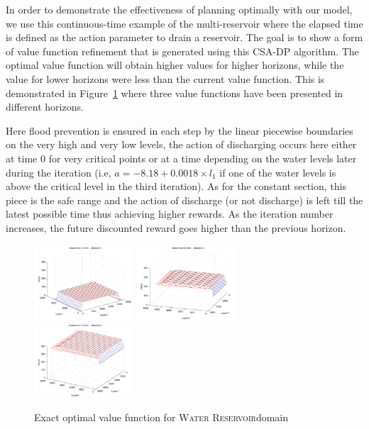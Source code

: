 \documentclass[letterpaper]{article}
\newcommand{\WaterReservoir}{\textsc{Water Reservoir}}
\begin{document}
In order to demonstrate the effectiveness of planning optimally with our model, we use this continuous-time example of the multi-reservoir where the elapsed time is defined as the action parameter to drain a reservoir. The goal is to show a form of value function refinement that is generated using this CSA-DP algorithm. The optimal value function will obtain higher values for higher horizons, while the value for lower horizons were less than the current value function. This is demonstrated in Figure~\ref{fig:reservoir} where three value functions have been presented in different horizons. 

Here flood prevention is ensured in each step by the linear piecewise boundaries on the very high and very low levels, the action of discharging occurs here either at time 0 for very critical points or at a time depending on the water levels later during the iteration (i.e, $a = -8.18 + 0.0018\times l_1$ if one of the water levels is above the critical level in the third iteration). As for the constant section, this piece is the safe range and the action of discharge (or not discharge) is left till the latest possible time thus achieving higher rewards. As the iteration number increases, the future discounted reward goes higher than the previous horizon. 

\begin{figure}[t]
\centering
\includegraphics[width=0.33\textwidth]{Figures1/ref1.pdf}
\includegraphics[width=0.33\textwidth]{Figures1/ref3.pdf}
\includegraphics[width=0.33\textwidth]{Figures1/ref6.pdf}
\caption{%
Exact optimal value function for \WaterReservoir  domain
}
\label{fig:reservoir}
\end{figure}
\end{document}
